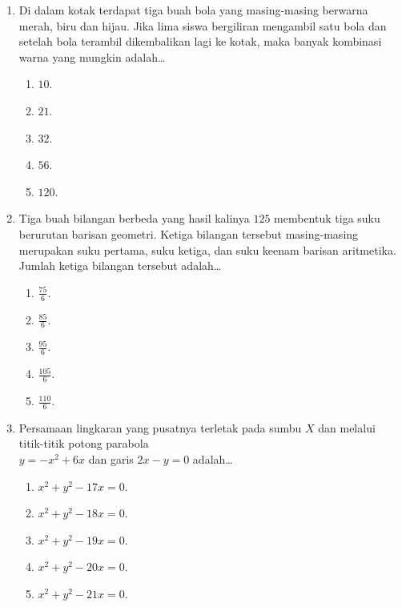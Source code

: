 \documentclass[A4,12PT, english, twocolumn]{journal}
\begin{document}
\begin{enumerate}
\item Di dalam kotak terdapat tiga buah bola yang masing-masing berwarna merah, biru dan hijau. Jika lima siswa bergiliran mengambil satu bola dan setelah bola terambil dikembalikan lagi ke kotak, maka banyak kombinasi warna yang mungkin adalah\dots
    \begin{enumerate}
        \item $10$.
        \item $21$.
        \item $32$.
        \item $56$.
        \item $120$.
    \end{enumerate}

\item Tiga buah bilangan berbeda yang hasil kalinya $125$ membentuk tiga suku berurutan barisan geometri. Ketiga bilangan tersebut masing-masing merupakan suku pertama, suku ketiga, dan suku keenam barisan aritmetika. Jumlah ketiga bilangan tersebut adalah\dots
    \begin{enumerate}
        \item $\frac{75}{6}$.
        \item $\frac{85}{6}$.
        \item $\frac{95}{6}$.
        \item $\frac{105}{6}$.
        \item $\frac{110}{6}$.
    \end{enumerate}

\item Persamaan lingkaran yang pusatnya terletak pada sumbu $X$ dan melalui titik-titik potong parabola \\ $y=-{{x}^{2}}+6x$ dan garis $2x-y=0$ adalah\dots
    \begin{enumerate}
        \item ${{x}^{2}}+{{y}^{2}}-17x=0$.
        \item ${{x}^{2}}+{{y}^{2}}-18x=0$.
        \item ${{x}^{2}}+{{y}^{2}}-19x=0$.
        \item ${{x}^{2}}+{{y}^{2}}-20x=0$.
        \item ${{x}^{2}}+{{y}^{2}}-21x=0$.
    \end{enumerate}
    

\end{enumerate}
\end{document}
